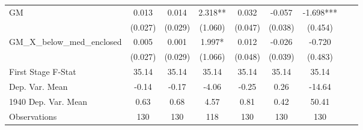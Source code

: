 \begin{tabular}{l*{8}{c}}
\cmidrule(lr){1-7}
GM              &    0.013   &    0.014   &    2.318** &    0.032   &   -0.057   &   -1.698***\\
                &  (0.027)   &  (0.029)   &  (1.060)   &  (0.047)   &  (0.038)   &  (0.454)   \\
\addlinespace
GM\_X\_below\_med\_enclosed&    0.005   &    0.001   &    1.997*  &    0.012   &   -0.026   &   -0.720   \\
                &  (0.027)   &  (0.029)   &  (1.066)   &  (0.048)   &  (0.039)   &  (0.483)   \\
\midrule
First Stage F-Stat&    35.14   &    35.14   &    35.14   &    35.14   &    35.14   &    35.14   \\
Dep. Var. Mean  &    -0.14   &    -0.17   &    -4.06   &    -0.25   &     0.26   &   -14.64   \\
1940 Dep. Var. Mean&     0.63   &     0.68   &     4.57   &     0.81   &     0.42   &    50.41   \\
Observations    &      130   &      130   &      118   &      130   &      130   &      130   \\
 \bottomrule \end{tabular}
